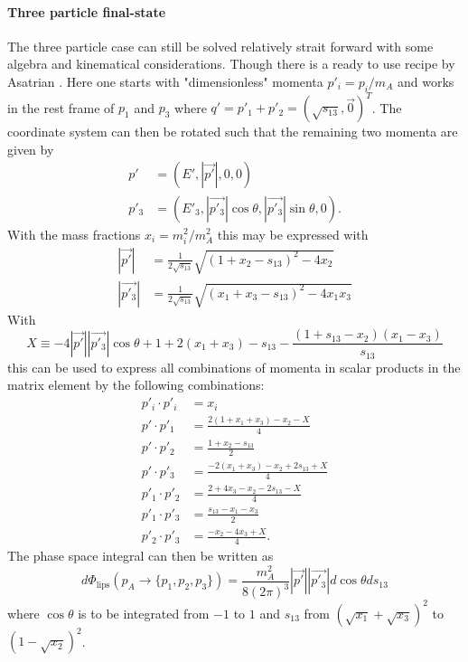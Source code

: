 \paragraph{Three particle final-state}
The three particle case can still be solved relatively strait forward with some algebra and kinematical considerations. Though there is a ready to use recipe by Asatrian
\cite{Asatrian:2012tp}. Here one starts with "dimensionless" momenta $p'_i=p_i/m_A$ and works in the rest frame of $p_1$ and $p_3$ where $q' = p'_1+p'_2=(\sqrt{s_{13}},\vec{0})^T$.
The coordinate system can then be rotated such that the remaining two momenta are given by
\begin{align}
p'&=(E',|\vec{p'}|,0,0)\\
p'_3&=(E'_3,|\vec{p'_3}|\cos\theta,|\vec{p'_3}|\sin \theta,0).
\end{align}
With the mass fractions $x_i = m_i^2/m_A^2$ this may be expressed with
\begin{align*}
|\vec{p'}| &= \frac{1}{2\sqrt{s_{13}}}\sqrt{(1+x_2-s_{13})^2-4x_2}\\
|\vec{p'_3}|&=\frac{1}{2\sqrt{s_{13}}}\sqrt{(x_1+x_3-s_{13})^2-4x_1x_3}
\end{align*}
With
\begin{equation}
X\equiv -4|\vec{p'}||\vec{p'_3}|\cos\theta+1+2(x_1+x_3)-s_{13}-\frac{(1+s_{13}-x_2)(x_1-x_3)}{s_{13}}
\end{equation}
this can be used to express all combinations of momenta in scalar products in the matrix element by the following combinations:
\begin{align}
p'_i\cdot p'_i&= x_i\\
p'\cdot p'_1&=\frac{2(1+x_1+x_3)-x_2-X}{4}\\
p'\cdot p'_2&=\frac{1+x_2-s_{13}}{2}\\
p'\cdot p'_3&=\frac{-2(x_1+x_3)-x_2+2s_{13}+X}{4}\\
p'_1\cdot p'_2&=\frac{2+4x_3-x_2-2s_{13}-X}{4}\\
p'_1\cdot p'_3&=\frac{s_{13}-x_1-x_3}{2}\\
p'_2\cdot p'_3&= \frac{-x_2-4x_3+X}{4}.
\end{align}
The phase space integral can then be written as
\begin{equation}
d\Phi_{\text{lips}}(p_A\rightarrow\{p_1,p_2,p_3\})=\frac{m_A^2}{8(2\pi )^3}|\vec{p'}||\vec{p'_3}|d\cos\theta d s_{13}
\end{equation}
where $\cos\theta$ is to be integrated from $-1$ to $1$ and $s_{13}$ from $(\sqrt{x_1}+\sqrt{x_3})^2$ to $(1-\sqrt{x_2})^2$.
